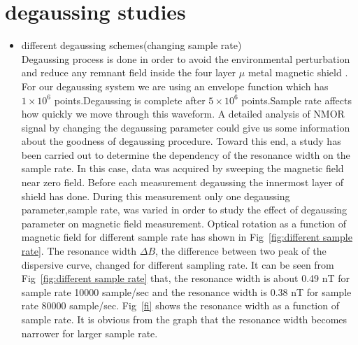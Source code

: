    \section{degaussing studies}  
   \begin{itemize}
   \item different degaussing schemes(changing sample rate)\\
Degaussing process is done in order to avoid the environmental perturbation and reduce any remnant field inside the four layer $\mu$ metal magnetic shield \cite{doi:10.1063/1.2713433}. For our degaussing system we are using an envelope function which has $1\times 10^6$ points.Degaussing is complete after $5\times 10^6$ points.Sample rate affects how quickly we move through this waveform. A detailed analysis of NMOR signal by changing the degaussing parameter could give us some information about the goodness of degaussing procedure. Toward this end, a study has been carried out to determine  the dependency of the resonance width on the sample rate. In this case, data was acquired by sweeping the magnetic field near zero field. Before each measurement degaussing the innermost layer of shield has done. During this measurement only one degaussing parameter,sample rate, was varied in order to study the effect of degaussing parameter on magnetic field measurement.  Optical rotation as a function of magnetic field for different sample rate has shown in Fig~\ref{fig:different sample rate}. The resonance width $\Delta B$, the difference between two peak of the dispersive curve, changed for different sampling rate. It can be seen from Fig~\ref{fig:different sample rate} that, the resonance width is about 0.49 nT for sample rate 10000 sample/sec and the resonance width is 0.38 nT for sample rate 80000 sample/sec. Fig~\ref{fi} shows the resonance width as a function of sample rate. It is obvious from the graph that the resonance width becomes narrower for larger sample rate.    
   

\end{itemize}
